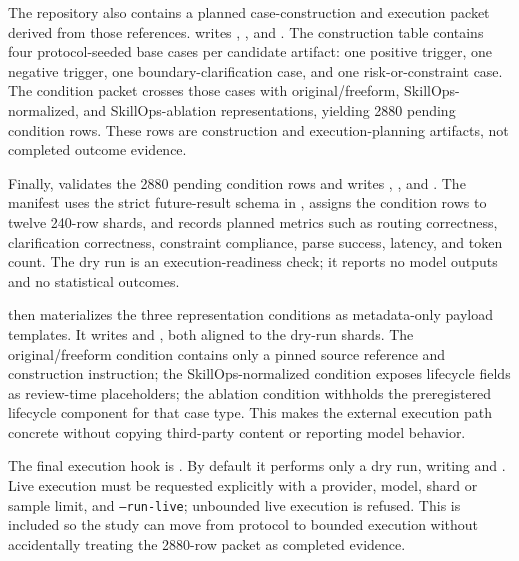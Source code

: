 \documentclass[11pt]{article}
\begin{document}
The repository also contains a planned case-construction and execution packet
derived from those references. 
writes ,
, and
. The construction table
contains four protocol-seeded base cases per candidate artifact: one positive
trigger, one negative trigger, one boundary-clarification case, and one
risk-or-constraint case. The condition packet crosses those cases with
original/freeform, SkillOps-normalized, and SkillOps-ablation representations,
yielding 2880 pending condition rows. These rows are construction and
execution-planning artifacts, not completed outcome evidence.

Finally,  validates the 2880
pending condition rows and writes
,
, and
. The manifest
uses the strict future-result schema in
, assigns the
condition rows to twelve 240-row shards, and records planned metrics such as
routing correctness, clarification correctness, constraint compliance, parse
success, latency, and token count. The dry run is an execution-readiness check;
it reports no model outputs and no statistical outcomes.

 then materializes the three
representation conditions as metadata-only payload templates. It writes
 and
, both
aligned to the dry-run shards. The original/freeform condition contains only a
pinned source reference and construction instruction; the SkillOps-normalized
condition exposes lifecycle fields as review-time placeholders; the ablation
condition withholds the preregistered lifecycle component for that case type.
This makes the external execution path concrete without copying third-party
content or reporting model behavior.

The final execution hook is .
By default it performs only a dry run, writing
 and
. Live execution must be
requested explicitly with a provider, model, shard or sample limit, and
\texttt{--run-live}; unbounded live execution is refused. This is included so
the study can move from protocol to bounded execution without accidentally
treating the 2880-row packet as completed evidence.
\end{document}
